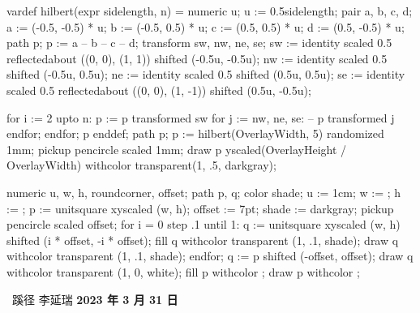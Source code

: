 \setupinteraction[
  title={ConTeXt 蹊径},
  author={李延瑞 (lyr.m2@live.cn)},
  keyword={TeX, ConTeXt MkIV, ConTeXt LMTX, LuaTeX, LuaMetaTeX}
]
\startMPinclusions
vardef hilbert(expr sidelength, n) = 
  numeric u; u := 0.5sidelength;
  pair a, b, c, d;
  a := (-0.5, -0.5) * u;
  b := (-0.5, 0.5) * u;
  c := (0.5, 0.5) * u;
  d := (0.5, -0.5) * u;
  path p; 
  p := a -- b -- c -- d;
  transform sw, nw, ne, se;
  sw := identity
        scaled 0.5
        reflectedabout ((0, 0), (1, 1))
        shifted (-0.5u, -0.5u);
  nw := identity
        scaled 0.5
        shifted (-0.5u, 0.5u);
  ne := identity
        scaled 0.5
        shifted (0.5u, 0.5u);
  se := identity
        scaled 0.5
        reflectedabout ((0, 0), (1, -1))
        shifted (0.5u, -0.5u);

  for i := 2 upto n:
    p := p transformed sw for j := nw, ne, se: -- p transformed j endfor;
  endfor;
  p
enddef;
\stopMPinclusions
{}
path p; p := hilbert(OverlayWidth, 5) randomized 1mm;
pickup pencircle scaled 1mm;
draw p yscaled(OverlayHeight / OverlayWidth) withcolor transparent(1, .5, darkgray); %
\stopuseMPgraphic
{}

numeric u, w, h, roundcorner, offset;
path p, q;
color shade;
u := 1cm; w := \overlaywidth; h := \overlayheight;
p := unitsquare xyscaled (w, h);
offset := 7pt;
shade := darkgray;
pickup pencircle scaled offset;
for i = 0 step .1 until 1:
    q := unitsquare xyscaled (w, h) shifted (i * offset, -i * offset);
    fill q withcolor transparent (1, .1, shade);
    draw q withcolor transparent (1, .1, shade);
endfor;
q := p shifted (-offset, offset);
draw q withcolor transparent (1, 0, white);
fill p withcolor ;
draw p withcolor ;
\stopuniqueMPgraphic
{}

\setupbackgrounds[page][background=TitleGraphic]
\startstandardmakeup
  \startcolor[white]
    \startcoverbox[middle][width=.6\textwidth,height=5cm,toffset=.8cm]
      \strut
      \hfil \bfd\ConTeXt\ 蹊径\hfil
      \blank[1cm]
      \hfil\bfa 李延瑞\hfil
      \blank[.25cm]
      \hfil\bf 2023 年 3 月 31 日\hfil
    \stopcoverbox
  \stopcolor
  \blank[14cm]
\stopstandardmakeup
\setupbackgrounds[page][background=]